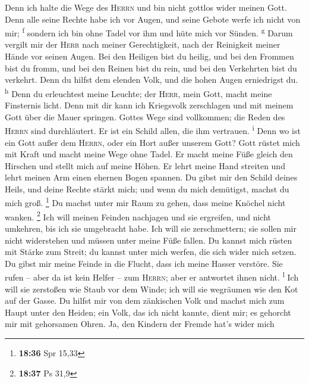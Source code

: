  Denn ich halte die Wege des \textsc{Herrn} und bin nicht
gottlos wider meinen Gott.  Denn alle seine Rechte habe
ich vor Augen, und seine Gebote werfe ich nicht von mir;
\textsuperscript{f}  sondern ich bin ohne Tadel vor ihm
und hüte mich vor Sünden. \textsuperscript{g}  Darum
vergilt mir der \textsc{Herr} nach meiner Gerechtigkeit, nach der
Reinigkeit meiner Hände vor seinen Augen.  Bei den
Heiligen bist du heilig, und bei den Frommen bist du fromm,
 und bei den Reinen bist du rein, und bei den Verkehrten
bist du verkehrt.  Denn du hilfst dem elenden Volk, und
die hohen Augen erniedrigst du. \textsuperscript{h}  Denn
du erleuchtest meine Leuchte; der \textsc{Herr}, mein Gott, macht meine
Finsternis licht.  Denn mit dir kann ich Kriegsvolk
zerschlagen und mit meinem Gott über die Mauer springen. 
Gottes Wege sind vollkommen; die Reden des \textsc{Herrn} sind
durchläutert. Er ist ein Schild allen, die ihm vertrauen.
\textsuperscript{i}  Denn wo ist ein Gott außer dem
\textsc{Herrn}, oder ein Hort außer unserem Gott?  Gott
rüstet mich mit Kraft und macht meine Wege ohne Tadel. 
Er macht meine Füße gleich den Hirschen und stellt mich auf meine Höhen.
 Er lehrt meine Hand streiten und lehrt meinen Arm einen
ehernen Bogen spannen.  Du gibst mir den Schild deines
Heils, und deine Rechte stärkt mich; und wenn du mich demütigst, machst
du mich groß. \footnote{\textbf{18:36} Spr 15,33}  Du
machst unter mir Raum zu gehen, dass meine Knöchel nicht wanken.
\footnote{\textbf{18:37} Ps 31,9}  Ich will meinen
Feinden nachjagen und sie ergreifen, und nicht umkehren, bis ich sie
umgebracht habe.  Ich will sie zerschmettern; sie sollen
mir nicht widerstehen und müssen unter meine Füße fallen.
 Du kannst mich rüsten mit Stärke zum Streit; du kannst
unter mich werfen, die sich wider mich setzen.  Du gibst
mir meine Feinde in die Flucht, dass ich meine Hasser verstöre.
 Sie rufen -- aber da ist kein Helfer -- zum
\textsc{Herrn}; aber er antwortet ihnen nicht. \textsuperscript{l}
 Ich will sie zerstoßen wie Staub vor dem Winde; ich will
sie wegräumen wie den Kot auf der Gasse.  Du hilfst mir
von dem zänkischen Volk und machst mich zum Haupt unter den Heiden; ein
Volk, das ich nicht kannte, dient mir;  es gehorcht mir
mit gehorsamen Ohren. Ja, den Kindern der Fremde hat's wider mich
